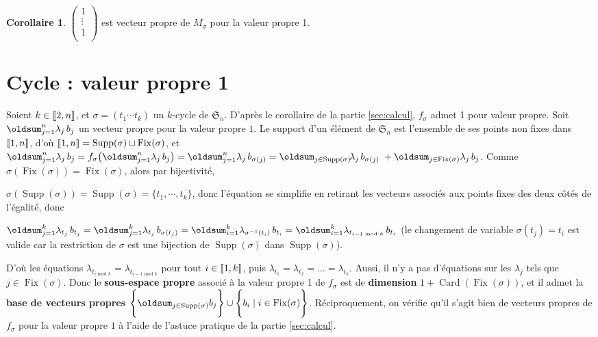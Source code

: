 \documentclass[10pt,a4paper,french,landscape]{article}
\DeclarePairedDelimiter\parenlong{\lparen}{\rparen}
\newcommand{\paren}[1]{\parenlong*{#1}}
\DeclarePairedDelimiter\bracketlong{\llbracket}{\rrbracket}
\newcommand{\br}[1]{\bracketlong*{#1}}
\renewcommand{\sum}{\displaystyle\oldsum}
\theoremstyle{definition}
\newtheorem*{cor*}{Corollaire}
\theoremstyle{remark}
\DeclareMathOperator{\Card}{Card}
\DeclareMathOperator{\Fix}{Fix}
\DeclareMathOperator{\Supp}{Supp}
\newcommand{\Sy}{\mathfrak{S}}
\newcommand{\1}{\mathbbm{1}}
\newcommand{\Sn}[1][n]{\Sy_{#1}}
\begin{document}
\begin{multicols*}{2}
\begin{cor*}
$\begin{pmatrix}
	1 \\
	\vdots \\
	1\\
\end{pmatrix}$ est vecteur propre de $M_\sigma$ pour la valeur propre 1.
\end{cor*}

\section{Cycle : valeur propre 1}
\label{sec:cycle-1}

Soient $k\in\br{2,n}$, et $\sigma=(t_1 \cdots t_k)$ un $k$-cycle de $\Sn$. D'après le corollaire de la partie \ref{sec:calcul}, $f_\sigma$ admet 1 pour valeur propre. Soit $\sum_{j=1}^n \lambda_{j}\, b_{j}$ un vecteur propre pour la valeur propre $1$. Le support d'un élément de $\Sn$ est l'ensemble de ses points non fixes dans $\br{1,n}$, d'où $\br{1,n}=\Supp(\sigma) \sqcup \Fix(\sigma)$, et $\sum_{j=1}^n \lambda_{j}\, b_{j}
=f_\sigma\paren{\sum_{j=1}^n \lambda_{j}\, b_{j}}
={\sum_{j=1}^n \lambda_{j}\, b_{\sigma(j)}}
=\sum_{j\in\Supp(\sigma)}\!\lambda_{j}\, b_{\sigma(j)}\;+\sum_{j\in\Fix(\sigma)} \lambda_{j}\, b_{j}
$.\;
Comme $\sigma(\Fix(\sigma))=\Fix(\sigma)$, alors par bijectivité,\medskip

\noindent
$\sigma(\Supp(\sigma))=\Supp(\sigma)=\{t_1, \cdots, t_k\}$, donc l'équation se simplifie en retirant les vecteurs associés aux points fixes des deux côtés de l'égalité, donc
\medskip

$
\sum_{j=1}^k \lambda_{t_j}\, b_{t_j}
=\sum_{j=1}^k \lambda_{t_j}\, b_{\sigma(t_j)}
=\sum_{i=1}^k \lambda_{\sigma^{-1}(t_i)}\, b_{t_i}
=\sum_{i=1}^k \lambda_{t_{i-1\text{ mod }k}}\, b_{t_{i}}
$ (le changement de variable $\sigma(t_j)=t_i$ est valide car la restriction de $\sigma$ est une bijection de $\Supp(\sigma)$ dans $\Supp(\sigma)$).\medskip

D'où les équations
$\lambda_{t_{i\text{ mod }k}}=\lambda_{t_{i-1\text{ mod }k}}$ pour tout $i\in\br{1,k}$, puis
${\lambda_{t_1}=\lambda_{t_{2}}=\ldots=\lambda_{t_k}}$. Aussi, il n'y a pas d'équations sur les $\lambda_j$ tels que $j\in\Fix(\sigma)$. Donc le \textbf{sous-espace propre} associé à la valeur propre 1 de $f_\sigma$ est de \textbf{dimension} ${1+\Card(\Fix(\sigma))}$, et il admet la \textbf{base de vecteurs propres}
$\Bigg\{\sum_{j\in\Supp(\sigma)} b_{j}\Bigg\}\cup\Bigg\{b_i\;|\;i\in\Fix(\sigma)\Bigg\}$.
Réciproquement, on vérifie qu'il s'agit bien de vecteurs propres de $f_\sigma$ pour la valeur propre $1$ à l'aide de l'astuce pratique de la partie \ref{sec:calcul}.


\end{multicols*}
\end{document}
